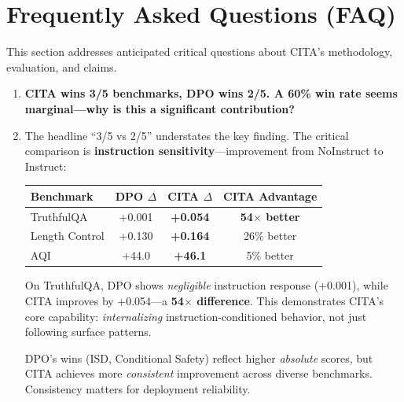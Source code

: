 
\onecolumn
\vspace{-2mm}
\section{Frequently Asked Questions (FAQ)}
\label{sec:faq}

This section addresses anticipated critical questions about CITA's methodology, evaluation, and claims.

\vspace{4mm}

\begin{enumerate}[label=\textbf{Q\arabic*.}, leftmargin=*, itemsep=8pt]

\item[\ding{93}] \textbf{CITA wins 3/5 benchmarks, DPO wins 2/5. A 60\% win rate seems marginal---why is this a significant contribution?}

\item[\ding{224}] The headline ``3/5 vs 2/5'' understates the key finding. The critical comparison is \textbf{instruction sensitivity}---improvement from NoInstruct to Instruct:

\begin{table}[H]
\centering
\small
\begin{tabular}{@{}lccc@{}}
\toprule
\textbf{Benchmark} & \textbf{DPO $\Delta$} & \textbf{CITA $\Delta$} & \textbf{CITA Advantage} \\
\midrule
TruthfulQA & +0.001 & \textbf{+0.054} & \textbf{54$\times$ better} \\
\hline
Length Control & +0.130 & \textbf{+0.164} & 26\% better \\
\hline
AQI & +44.0 & \textbf{+46.1} & 5\% better \\
\bottomrule
\end{tabular}
\end{table}

On TruthfulQA, DPO shows \textit{negligible} instruction response (+0.001), while CITA improves by +0.054---a \textbf{54$\times$ difference}. This demonstrates CITA's core capability: \textit{internalizing} instruction-conditioned behavior, not just following surface patterns.

DPO's wins (ISD, Conditional Safety) reflect higher \textit{absolute} scores, but CITA achieves more \textit{consistent} improvement across diverse benchmarks. Consistency matters for deployment reliability.


\end{enumerate}
